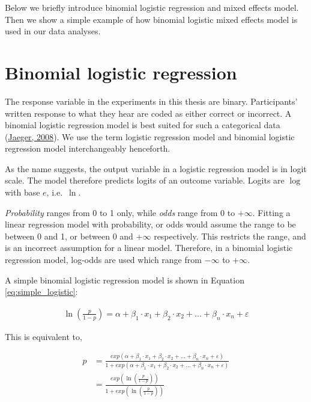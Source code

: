 \documentclass[a4paper, nobind]{templates/ociamthesis}
\begin{document}
Below we briefly introduce binomial logistic regression and mixed effects model.
Then we show a simple example of how binomial logistic mixed effects model is used in our data analyses.

\hypertarget{binomial-logistic-regression}{%
\section{Binomial logistic regression}\label{binomial-logistic-regression}}

The response variable in the experiments in this thesis are binary.
Participants' written response to what they hear are coded as either correct or incorrect.
A binomial logistic regression model is best suited for such a categorical data (\protect\hyperlink{ref-Jaeger2008}{Jaeger, 2008}).
We use the term logistic regression model and binomial logistic regression model interchangeably henceforth.

As the name suggests, the output variable in a logistic regression model is in logit scale.
The model therefore predicts logits of an outcome variable.
Logits are \(\log\) with base \(e\), i.e.~\(\ln\).

\emph{Probability} ranges from 0 to 1 only, while \emph{odds} range from 0 to \(+\infty\).
Fitting a linear regression model with probability, or odds would assume the range to be between 0 and 1, or between 0 and \(+\infty\) respectively.
This restricts the range, and is an incorrect assumption for a linear model.
Therefore, in a binomial logistic regression model, log-odds are used which range from \(-\infty\) to \(+\infty\).

A simple binomial logistic regression model is shown in Equation \ref{eq:simple_logistic}:

\begin{align} \label{eq:simple_logistic}
\ln(\frac{p}{1-p}) =
\alpha + 
\beta_{1}\cdot{x_1} + 
\beta_{2}\cdot{x_2} + ... +
\beta_{n}\cdot{x_n} + \varepsilon
\end{align}

This is equivalent to,

\begin{align} \label{eq:logit-to-prob_long}
p &=
{\frac{exp(\alpha + 
\beta_{1}\cdot{x_1} + 
\beta_{2}\cdot{x_2} + ... +
\beta_{n}\cdot{x_n} + \varepsilon)}
{1 + exp (\alpha + 
\beta_{1}\cdot{x_1} + 
\beta_{2}\cdot{x_2} + ... +
\beta_{n}\cdot{x_n} + \varepsilon)}}\\ \label{eq:logit-to-prob_short}
&= {\frac{exp(\ln(\frac{p}{1-p}))}{1 + exp (\ln(\frac{p}{1-p}))}}
\end{align}
\end{document}
